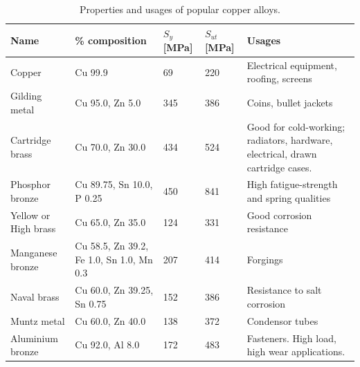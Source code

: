 \documentclass[
10pt,
a4paper,
openany,
svgnames,
]{book}
\begin{document}
\begin{table}[H]
  \centering
  \caption{Properties and usages of popular copper alloys. \cite{plisga2017standard}}
  \label{tab: copper alloy props and uses}
  {\renewcommand{\arraystretch}{1.4}
  \begin{tabular}{lL{3cm}llL{4cm}}
    \toprule
    Name                 & \% composition                           & $S_y$ [MPa] & $S_{ut}$ [MPa] & Usages                                                                                              \\
    \midrule
    Copper               & Cu 99.9                                  & 69          & 220             & Electrical equipment, roofing, screens                                                                   \\
    Gilding metal        & Cu 95.0, Zn 5.0                          & 345          & 386             & Coins, bullet jackets                                                                                    \\
    Cartridge brass      & Cu 70.0, Zn 30.0                         & 434          & 524             & Good for cold-working; radiators, hardware, electrical, drawn cartridge cases.                           \\
    Phosphor bronze      & Cu 89.75, Sn 10.0, P 0.25                & 450           & 841            & High fatigue-strength and spring qualities                                                               \\
    Yellow or High brass & Cu 65.0, Zn 35.0                         & 124          & 331           & Good corrosion resistance                                                                                \\
    Manganese bronze     & Cu 58.5, Zn 39.2, Fe 1.0, Sn 1.0, Mn 0.3 & 207          & 414             & Forgings                                                                                                 \\
    Naval brass          & Cu 60.0, Zn 39.25, Sn 0.75               & 152          & 386             & Resistance to salt corrosion                                                                             \\
    Muntz metal          & Cu 60.0, Zn 40.0                         & 138          & 372             & Condensor tubes                                                                                          \\
    Aluminium bronze     & Cu 92.0, Al 8.0                          & 172          & 483             & Fasteners. High load, high wear applications.                                                                                                        \\

\end{tabular}}
\end{table}
\end{document}
